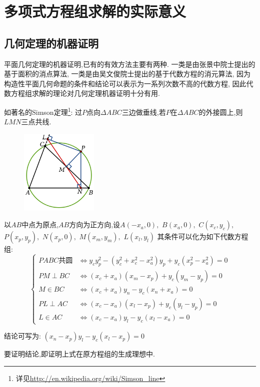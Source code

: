 \section{多项式方程组求解的实际意义}
\subsection{几何定理的机器证明}
	平面几何定理的机器证明,已有的有效方法主要有两种.
	一类是由张景中院士提出的基于面积的消点算法\cite{area_geo},
	一类是由吴文俊院士提出的基于代数方程的消元算法\cite{wwj},
	因为构造性平面几何命题的条件和结论可以表示为一系列次数不高的代数方程,
	因此代数方程组求解的理论对几何定理机器证明十分有用.
	
	如著名的Simson定理\footnote{详见\url{http://en.wikipedia.org/wiki/Simson_line}}:
	过$ P$点向$ \Delta ABC$三边做垂线,若$ P$在$ \Delta ABC$的外接圆上,则$  LMN$三点共线.
	\begin{figure}[h]
		\includegraphics[width=10em]{res/Simson.png}
	\end{figure}

	以$ AB$中点为原点,$AB$方向为正方向,设$ A(-x_a,0),$ $B(x_a,0),$ $C(x_c,y_c),$ $P(x_p,y_p),$ $N(x_p,0),$ $M(x_m,y_m),$ $L(x_l,y_l)$
	其条件可以化为如下代数方程组:
	\[  \begin{cases}
		PABC\texttt{共圆} &\Leftrightarrow y_cy_p^2-(y_c^2+x_c^2-x_a^2)y_p+y_c(x_p^2-x_a^2) =0\\
		PM\perp BC &\Leftrightarrow (x_c+x_a)(x_m-x_p)+y_c(y_m-y_p) =0\\
		M \in BC &\Leftrightarrow (x_c + x_a)y_n - y_c(x_n+x_a) =0\\
		PL \perp AC &\Leftrightarrow (x_c-x_a)(x_l-x_p) + y_c(y_l-y_p) = 0\\
		L \in AC &\Leftrightarrow (x_c-x_a)y_l - y_c(x_l-x_a)  = 0
	\end{cases}\]

	结论可写为: 
	$ (x_n-x_p)y_l - y_c(x_l-x_p) = 0$

	要证明结论,即证明上式在原方程组的生成理想中.

